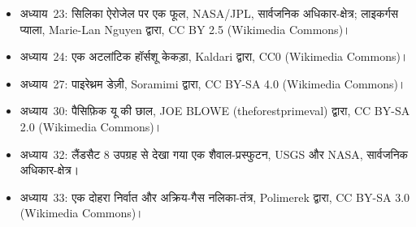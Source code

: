 \begin{itemize}
  \item अध्याय~23: सिलिका ऐरोजेल पर एक फूल, NASA/JPL, सार्वजनिक अधिकार-क्षेत्र;
        लाइकर्गस प्याला, Marie-Lan Nguyen द्वारा, CC BY 2.5 (Wikimedia Commons)।
  \item अध्याय~24: एक अटलांटिक हॉर्सशू केकड़ा, Kaldari द्वारा, CC0 (Wikimedia
        Commons)।
  \item अध्याय~27: पाइरेथ्रम डेज़ी, Soramimi द्वारा, CC BY-SA 4.0 (Wikimedia
        Commons)।
  \item अध्याय~30: पैसिफ़िक यू की छाल, JOE BLOWE (theforestprimeval) द्वारा,
        CC BY-SA 2.0 (Wikimedia Commons)।
  \item अध्याय~32: लैंडसैट 8 उपग्रह से देखा गया एक शैवाल-प्रस्फुटन, USGS और NASA,
        सार्वजनिक अधिकार-क्षेत्र।
  \item अध्याय~33: एक दोहरा निर्वात और अक्रिय-गैस नलिका-तंत्र, Polimerek द्वारा, CC BY-SA
        3.0 (Wikimedia Commons)।
\end{itemize}
\clearpage
